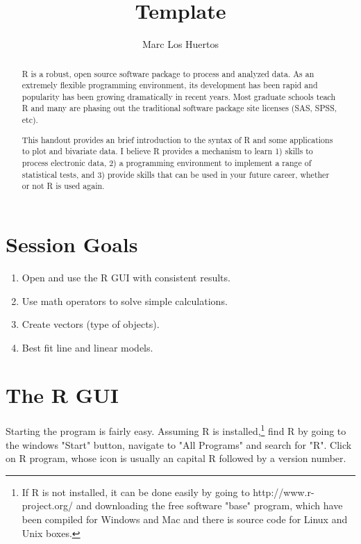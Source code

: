 \documentclass{tufte-handout}\usepackage[]{graphicx}\usepackage[]{xcolor}
\title{Template %
}
\author[Marc Los Huertos]{Marc Los Huertos}
\date{}  %
\begin{document}
\maketitle%
\begin{abstract}
\noindent R is a robust, open source software package to process and analyzed data. As an extremely flexible programming environment, its development has been rapid and popularity has been growing dramatically in recent years. Most graduate schools teach R and many are phasing out the traditional software package site licenses (\eg SAS, SPSS, etc). 

This handout provides an brief introduction to the syntax of R and some applications to plot and bivariate data. I believe R provides a mechanism to learn 1) skills to process electronic data, 2) a programming environment to implement a range of statistical tests, and 3) provide skills that can be used in your future career, whether or not R is used again.
\end{abstract}



\section{Session Goals}

\begin{enumerate}
	\item Open and use the R GUI with consistent results.
	\item Use math operators to solve simple calculations.
	\item Create vectors (type of objects).
	\item Best fit line and linear models.
\end{enumerate}

\section{The R GUI}

Starting the program is fairly easy. Assuming R is installed,\footnote[][.03in]{If R is not installed, it can be done easily by going to http://www.r-project.org/ and downloading the free software "base" program, which have been compiled for Windows and Mac and there is source code for Linux and Unix boxes.} find R by going to the windows "Start" button, navigate to "All Programs" and search for "R". Click on R program, whose icon is usually an capital R followed by a version number. 
\end{document}
